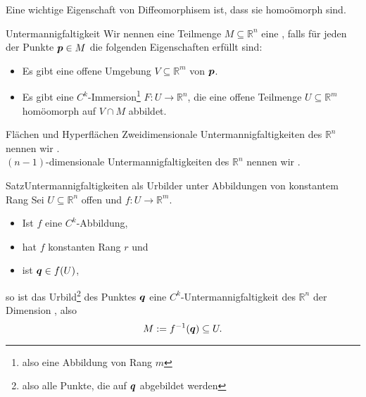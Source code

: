 Eine wichtige Eigenschaft von Diffeomorphisem ist, dass sie homoömorph sind.
\begin{Def}
{Untermannigfaltigkeit}
Wir nennen eine Teilmenge $M\subseteq\mathbb{R}^n$ eine , falls für jeden der Punkte ${{\text{\boldmath${p}$}}}\in M$ die folgenden Eigenschaften erfüllt sind:
\begin{itemize}
    \item Es gibt eine offene Umgebung $V\subseteq\mathbb{R}^m$ von ${{\text{\boldmath${p}$}}}$.
    \item Es gibt eine $C^k$-Immersion\footnote{also eine Abbildung von Rang $m$} $F:U\to\mathbb{R}^n$, die eine offene Teilmenge $U\subseteq\mathbb{R}^m$ homöomorph auf $V\cap M$ abbildet.
\end{itemize}
\end{Def}
\begin{Def}
{Flächen und Hyperflächen}
Zweidimensionale Untermannigfaltigkeiten des $\mathbb{R}^n$ nennen wir .\\
$(n-1)$-dimensionale Untermannigfaltigkeiten des $\mathbb{R}^n$ nennen wir .
\end{Def}
\begin{Satz}
{Satz}{Untermannigfaltigkeiten als Urbilder unter Abbildungen von konstantem Rang}
Sei $U\subseteq\mathbb{R}^n$ offen und $f:U\to\mathbb{R}^m$.
\begin{itemize}
    \item Ist $f$ eine $C^k$-Abbildung,
    \item hat $f$ konstanten Rang $r$ und
    \item ist ${{\text{\boldmath${q}$}}}\in f(U)$,
\end{itemize}
so ist das Urbild\footnote{also alle Punkte, die auf ${{\text{\boldmath${q}$}}}$ abgebildet werden} des Punktes ${{\text{\boldmath${q}$}}}$ eine $C^k$-Untermannigfaltigkeit des $\mathbb{R}^n$ der Dimension , also
\begin{equation}
    M:=f^{-1}({{\text{\boldmath${q}$}}})\subseteq U.
\end{equation}
\end{Satz}
